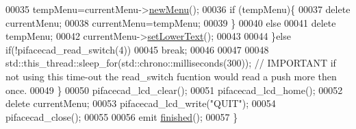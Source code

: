 \begin{DoxyCode}
00035             tempMenu=currentMenu->\hyperlink{classAbstractMenu_aef49c4a4ceeb1aad12101cb4768e1596}{newMenu}();
00036             \textcolor{keywordflow}{if} (tempMenu)\{
00037                 \textcolor{keyword}{delete} currentMenu;
00038                 currentMenu=tempMenu;
00039             \}
00040             \textcolor{keywordflow}{else}
00041                 \textcolor{keyword}{delete} tempMenu;
00042             currentMenu->\hyperlink{classAbstractMenu_a5fd1c385e4acd825631ede5bb0424a5c}{setLowerText}();
00043 
00044         \}\textcolor{keywordflow}{else} \textcolor{keywordflow}{if}(!pifacecad\_read\_switch(4))
00045             \textcolor{keywordflow}{break};
00046 
00047 
00048         std::this\_thread::sleep\_for(std::chrono::milliseconds(300));  \textcolor{comment}{// IMPORTANT if not using this
       time-out the read\_switch fucntion would read a push more then once.}
00049     \}
00050     pifacecad\_lcd\_clear();
00051     pifacecad\_lcd\_home();
00052     \textcolor{keyword}{delete} currentMenu;
00053     pifacecad\_lcd\_write(\textcolor{stringliteral}{"QUIT"});
00054     pifacecad\_close();
00055 
00056     emit \hyperlink{classPiFaceControlAndView_a704d233cb698bce10515c0af721581ce}{finished}();
00057 \}
\end{DoxyCode}
